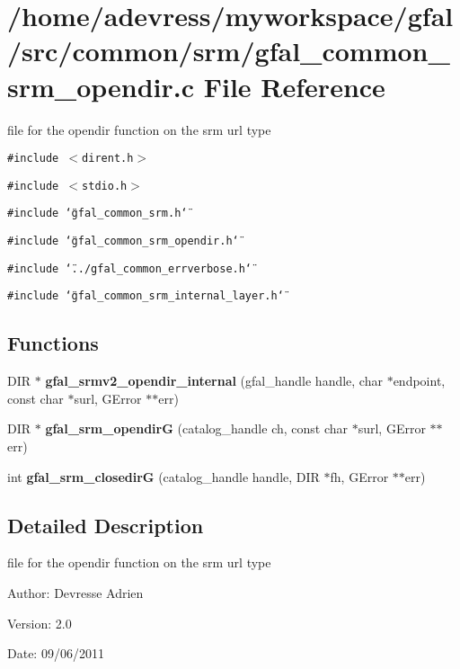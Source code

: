 \section{/home/adevress/myworkspace/gfal/src/common/srm/gfal\_\-common\_\-srm\_\-opendir.c File Reference}
\label{gfal__common__srm__opendir_8c}
file for the opendir function on the srm url type 

{\tt \#include $<$dirent.h$>$}\par
{\tt \#include $<$stdio.h$>$}\par
{\tt \#include \char`\"{}gfal\_\-common\_\-srm.h\char`\"{}}\par
{\tt \#include \char`\"{}gfal\_\-common\_\-srm\_\-opendir.h\char`\"{}}\par
{\tt \#include \char`\"{}../gfal\_\-common\_\-errverbose.h\char`\"{}}\par
{\tt \#include \char`\"{}gfal\_\-common\_\-srm\_\-internal\_\-layer.h\char`\"{}}\par
\subsection*{Functions}
\begin{CompactItemize}
\item 
DIR $\ast$ \textbf{gfal\_\-srmv2\_\-opendir\_\-internal} (gfal\_\-handle handle, char $\ast$endpoint, const char $\ast$surl, GError $\ast$$\ast$err)\label{gfal__common__srm__opendir_8c_b49293dea5de17fd7bba94b2c604ae36}

\item 
DIR $\ast$ \textbf{gfal\_\-srm\_\-opendir\-G} (catalog\_\-handle ch, const char $\ast$surl, GError $\ast$$\ast$err)\label{gfal__common__srm__opendir_8c_5011b06c09c56864815f6bf642b11c24}

\item 
int \textbf{gfal\_\-srm\_\-closedir\-G} (catalog\_\-handle handle, DIR $\ast$fh, GError $\ast$$\ast$err)\label{gfal__common__srm__opendir_8c_b13933375563a6c4cc44eb6d206c6fd9}

\end{CompactItemize}


\subsection{Detailed Description}
file for the opendir function on the srm url type 

\begin{Desc}
\item[Author:]Devresse Adrien \end{Desc}
\begin{Desc}
\item[Version:]2.0 \end{Desc}
\begin{Desc}
\item[Date:]09/06/2011 \end{Desc}
